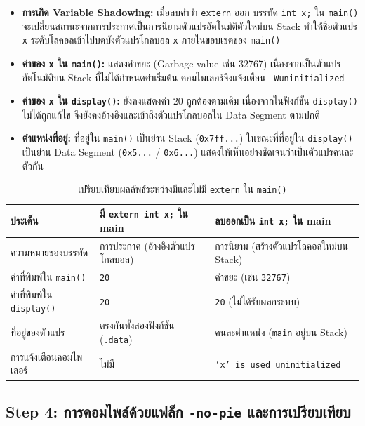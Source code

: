 \documentclass[a4paper,11pt]{article}
\newcommand{\code}[1]{\texttt{#1}}
\begin{document}
\begin{itemize}[leftmargin=*]
  \item \textbf{การเกิด Variable Shadowing:} เมื่อลบคำว่า \code{extern} ออก บรรทัด \code{int x;} ใน \code{main()} จะเปลี่ยนสถานะจากการประกาศเป็นการนิยามตัวแปรอัตโนมัติตัวใหม่บน Stack ทำให้ชื่อตัวแปร \code{x} ระดับโลคอลเข้าไปบดบังตัวแปรโกลบอล \code{x} ภายในขอบเขตของ \code{main()}
  \item \textbf{ค่าของ \code{x} ใน \code{main()}:} แสดงค่าขยะ (Garbage value เช่น 32767) เนื่องจากเป็นตัวแปรอัตโนมัติบน Stack ที่ไม่ได้กำหนดค่าเริ่มต้น คอมไพเลอร์จึงแจ้งเตือน \code{-Wuninitialized}
  \item \textbf{ค่าของ \code{x} ใน \code{display()}:} ยังคงแสดงค่า $20$ ถูกต้องตามเดิม เนื่องจากในฟังก์ชัน \code{display()} ไม่ได้ถูกแก้ไข จึงยังคงอ้างอิงและเข้าถึงตัวแปรโกลบอลใน Data Segment ตามปกติ
  \item \textbf{ตำแหน่งที่อยู่:} ที่อยู่ใน \code{main()} เป็นย่าน Stack (\code{0x7ff...}) ในขณะที่ที่อยู่ใน \code{display()} เป็นย่าน Data Segment (\code{0x5...} / \code{0x6...}) แสดงให้เห็นอย่างชัดเจนว่าเป็นตัวแปรคนละตัวกัน
\end{itemize}

\begin{table}[H]
\centering\small
\caption{เปรียบเทียบผลลัพธ์ระหว่างมีและไม่มี \code{extern} ใน \code{main()}}
\begin{tabular}{p{3.5cm}p{5.2cm}p{5.2cm}}
\toprule
\textbf{ประเด็น} & \textbf{มี \code{extern int x;} ใน main} & \textbf{ลบออกเป็น \code{int x;} ใน main} \\
\midrule
ความหมายของบรรทัด & การประกาศ (อ้างอิงตัวแปรโกลบอล) & การนิยาม (สร้างตัวแปรโลคอลใหม่บน Stack) \\
ค่าที่พิมพ์ใน \code{main()} & \code{20} & ค่าขยะ (เช่น \code{32767}) \\
ค่าที่พิมพ์ใน \code{display()} & \code{20} & \code{20} (ไม่ได้รับผลกระทบ) \\
ที่อยู่ของตัวแปร & ตรงกันทั้งสองฟังก์ชัน (\code{.data}) & คนละตำแหน่ง (\code{main} อยู่บน Stack) \\
การแจ้งเตือนคอมไพเลอร์ & ไม่มี & \code{'x' is used uninitialized} \\
\bottomrule
\end{tabular}
\end{table}

\subsection{Step 4: การคอมไพล์ด้วยแฟล็ก \code{-no-pie} และการเปรียบเทียบ}
\end{document}
